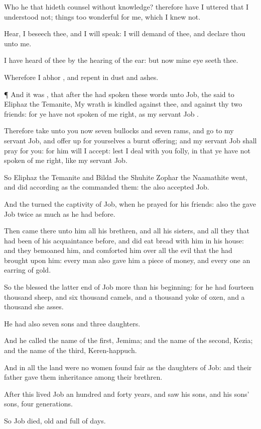 {Who
{} he that
hideth
counsel without
knowledge? therefore have I
uttered that I
understood not; things too
wonderful for me, which I
knew not.

Hear, I beseech thee, and I will
speak: I will
demand of thee, and
declare thou unto me.

I have
heard of thee by the
hearing of the
ear: but now mine
eye
seeth thee.

Wherefore I
abhor
{}, and
repent in
dust and
ashes.


\par }{\PP {}¶ And it was
{}, that
after the
{} had
spoken these
words unto
Job, the
{}
said to
Eliphaz the
Temanite, My
wrath is
kindled against thee, and against thy
two
friends: for ye have not
spoken of me
{}
right, as my
servant
Job
{}.

Therefore
take unto you now
seven
bullocks and
seven
rams, and
go to my
servant
Job, and offer
up for yourselves a burnt
offering; and my
servant
Job shall
pray for you: for
him will I
accept: lest I
deal with you
{}
folly, in that ye have not
spoken of me
{}
right, like my
servant
Job.

So
Eliphaz the
Temanite and
Bildad the
Shuhite
{}
Zophar the
Naamathite
went, and
did according as the
{}
commanded them: the
{} also
accepted
Job.


\par }{\PP {}And the
{}
turned the
captivity of
Job, when he
prayed for his
friends: also the
{}
gave
Job twice as
much as he had before.

Then
came there unto him all his
brethren, and all his
sisters, and all they that had been of his
acquaintance
before, and did
eat
bread with him in his
house: and they
bemoaned him, and
comforted him over all the
evil that the
{} had
brought upon him: every
man also
gave him
a piece of
money, and every
one an
earring of
gold.

So the
{}
blessed the latter
end of
Job more than his
beginning: for he had
fourteen
thousand
sheep, and
six
thousand
camels, and a
thousand
yoke of
oxen, and a
thousand she
asses.

He had also
seven
sons and
three
daughters.

And he
called the
name of the
first,
Jemima; and the
name of the
second,
Kezia; and the
name of the
third,
Keren-happuch.

And in all the
land were no
women
found
{}
fair as the
daughters of
Job: and their
father
gave them
inheritance
among their
brethren.

After this
lived
Job an
hundred and
forty
years, and
saw his
sons, and his
sons’
sons,
{}
four
generations.

So
Job
died,
{}
old and
full of
days.


\par }